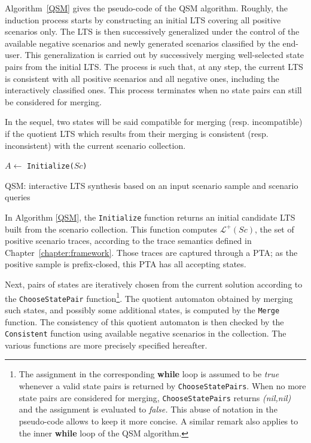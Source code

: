 Algorithm~\ref{QSM} gives the pseudo-code of the \textsc{QSM} algorithm. Roughly, the induction process starts by constructing an initial LTS covering all positive scenarios only. The LTS is then successively generalized under the control of the available negative scenarios and newly generated scenarios classified by the end-user. This generalization is carried out by successively merging well-selected state pairs from the initial LTS. The process is such that, at any step, the current LTS is consistent with all positive scenarios and all negative ones, including the interactively classified ones. This process terminates when no state pairs can still be considered for merging.

In the sequel, two states will be said compatible for merging (resp. incompatible) if the quotient LTS which results from their merging is consistent (resp. inconsistent) with the current scenario collection.

\begin{algorithm}
{
$A \leftarrow $ {\tt Initialize($Sc$)}\\
}
\vspace{0.2cm}
\caption{\textsc{QSM}: interactive LTS synthesis based on an input scenario sample and scenario queries\label{QSM}}
\end{algorithm}

In Algorithm \ref{QSM}, the \texttt{Initialize} function returns an initial candidate LTS built from the scenario collection. This function computes $\mathcal{L}^+(Sc)$, the set of positive scenario traces, according to the trace semantics defined in Chapter~\ref{chapter:framework}. Those traces are captured through a PTA; as the positive sample is prefix-closed, this PTA has all accepting states.

Next, pairs of states are iteratively chosen from the current solution according to the \texttt{ChooseStatePair} function\footnote{The assignment in the corresponding \textbf{while} loop is assumed to be \textit{true} whenever a valid state pairs is returned by \texttt{ChooseStatePairs}. When no more state pairs are considered for merging, \texttt{ChooseStatePairs} returns \textit{(nil,nil)} and the assignment is evaluated to \textit{false.} This abuse of notation in the pseudo-code allows to keep it more concise. A similar remark also applies to the inner \textbf{while} loop of the \textsc{QSM} algorithm.}. The quotient automaton obtained by merging such states, and possibly some additional states, is computed by the \texttt{Merge} function. The consistency of this quotient automaton is then checked by the \texttt{Consistent} function using available negative scenarios in the collection. The various functions are more precisely specified hereafter.

